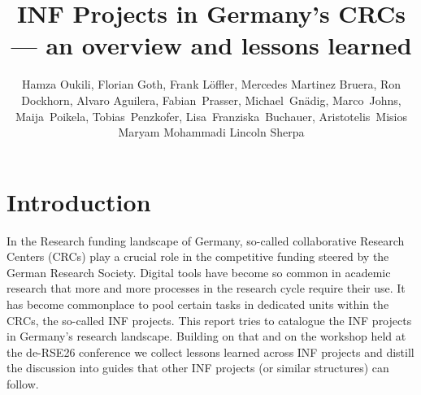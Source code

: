 \documentclass{eceasst}
\title{INF Projects in Germany's CRCs --- an overview and lessons learned}
\author{
Hamza Oukili\authorOrcid{0000-0003-4695-8532}\authorRef{1},
Florian Goth\authorOrcid{0000-0003-2707-4790}\authorRef{2},
Frank Löffler\authorOrcid{0000-0001-6643-6323}\authorRef{3},
Mercedes Martinez Bruera\authorOrcid{0009-0004-2891-7045}\authorRef{4},
Ron Dockhorn\authorOrcid{0000-0002-5268-5430}\authorRef{8},
Alvaro Aguilera\authorOrcid{0000-0001-9324-8555}\authorRef{8},
Fabian~Prasser\authorOrcid{0000-0003-3172-3095}\authorRef{5},
Michael~Gnädig\authorOrcid{}\authorRef{5},
Marco~Johns\authorOrcid{0000-0003-4706-6595}\authorRef{5},
Maija~Poikela\authorOrcid{0000-0003-2616-4401}\authorRef{5}, 
Tobias~Penzkofer\authorOrcid{0000-0001-9591-8575}\authorRef{6}, 
Lisa~Franziska~Buchauer\authorOrcid{0000-0002-4722-8390}\authorRef{6}, 
Aristotelis~Misios\authorOrcid{}\authorRef{6}
Maryam Mohammadi\authorOrcid{0009-0007-8747-029X}\authorRef{7}
Lincoln Sherpa\authorOrcid{0009-0000-3287-0295}\authorRef{8}
} %
\institute{%
\autlabel{1} Institute for Modeling Hydraulic and Environmental Systems (IWS), University of Stuttgart,\\
\autlabel{2} Institut für theoretische Physik 1, University of Würzburg, 97074, Würzburg,\\
\autlabel{3} Heinz Nixdorf Chair for Distributed Information Systems, Jena, Germany,\\
\autlabel{4} Goethe-Universität Frankfurt am Main, Frankfurt am Main,\\
\autlabel{8} Center for Interdisciplinary Digital Sciences, Technische Universität Dresden, D-01069 Dresden, Germany,\\
\autlabel{5} Berlin Institute of Health at Charité - Universitätsmedizin Berlin, Berlin, Germany\\
\autlabel{6} Charité - Universitätsmedizin Berlin, Berlin, Germany\\
\autlabel{7} Linguistic Department, University of Bielefeld\\
}
\begin{document}
\maketitle

\section{Introduction}
In the Research funding landscape of Germany, so-called collaborative Research Centers (CRCs) play a crucial role in the competitive funding steered by the German Research Society.
Digital tools have become so common in academic research that more and more processes in the research cycle require their use.
It has become commonplace to pool certain tasks in dedicated units within the CRCs, the so-called INF projects.
This report tries to catalogue the INF projects in Germany's research landscape.
Building on that and on the workshop held at the de-RSE26 conference we collect lessons learned across INF projects and distill the discussion into guides that other INF projects (or similar structures) can follow.
\end{document}
